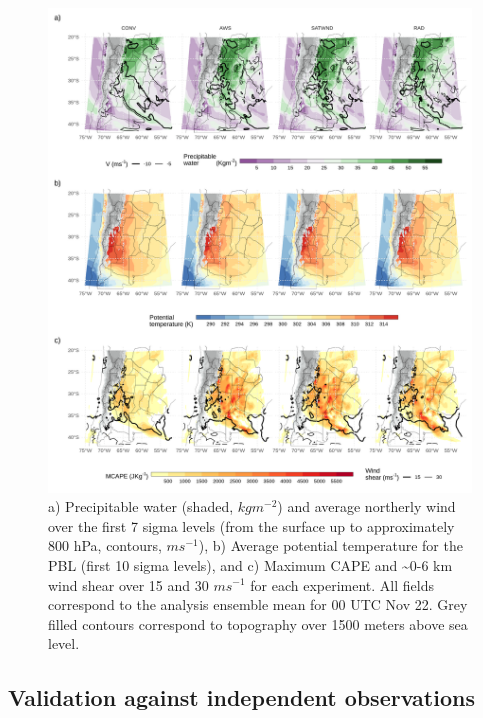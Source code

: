 \documentclass[final,5p,times,twocolumn,authoryear]{elsarticle} %
\begin{document}
\begin{figure}
\includegraphics[width=1\linewidth]{../figures/summary-fields-1} \caption{a) Precipitable water (shaded, \(kgm^{-2}\)) and average northerly wind over the first 7 sigma levels (from the surface up to approximately 800 hPa, contours, \(ms^{-1}\)), b) Average potential temperature for the PBL (first 10 sigma levels), and c) Maximum CAPE and \textasciitilde0-6 km wind shear over 15 and 30 \(ms^{-1}\) for each experiment. All fields correspond to the analysis ensemble mean for 00 UTC Nov 22. Grey filled contours correspond to topography over 1500 meters above sea level.}\label{fig:summary-fields}
\end{figure}

\hypertarget{validation-against-independent-observations}{%
\subsection{Validation against independent observations}\label{validation-against-independent-observations}}
\end{document}
